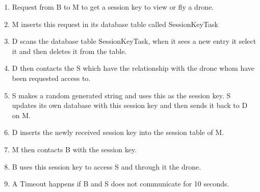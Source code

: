 \begin{enumerate}
	\item Request from B to M to get a session key to view or fly a drone.
	\item M inserts this request in its database table called SessionKeyTask
	\item D scans the database table SessionKeyTask, when it sees a new entry it select it and then deletes it from the table.
	\item D then contacts the S which have the relationship with the drone whom have been requested access to.
	\item S makes a random generated string and uses this as the session key. S updates its own database with this session key and then sends it back to D on M.
	\item D inserts the newly received session key into the session table of M.
	\item M then contacts B with the session key.
	\item B uses this session key to access S and through it the drone.
	\item A Timeout happens if B and S does not communicate for 10 seconds.
\end{enumerate}


